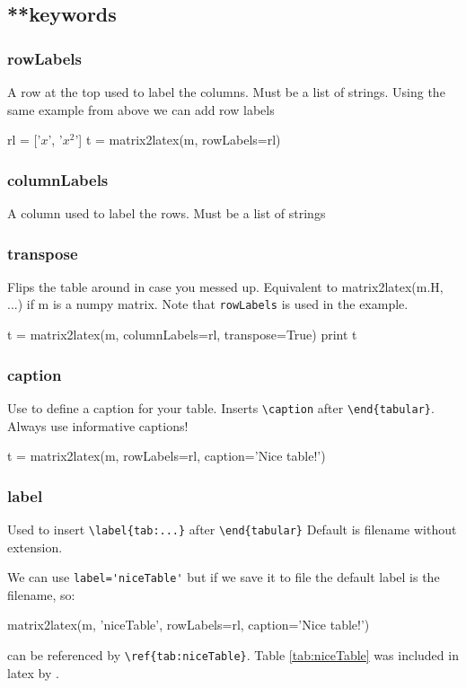 \subsection{**keywords}
\subsubsection{rowLabels}
    A row at the top used to label the columns.
    Must be a list of strings.
Using the same example from above we can add row labels
\begin{sageblock}
rl = ['$x$', '$x^2$']
t = matrix2latex(m, rowLabels=rl)
\end{sageblock}

\subsubsection{columnLabels}
    A column used to label the rows.
    Must be a list of strings
\subsubsection{transpose}
Flips the table around in case you messed up. Equivalent to
matrix2latex(m.H, ...)
if m is a numpy matrix.
Note that \lstinline{rowLabels} is used in the example.
\begin{sageblock}
t = matrix2latex(m, columnLabels=rl, transpose=True)
print t
\end{sageblock}

\subsubsection{caption}
    Use to define a caption for your table.
    Inserts \verb!\caption! after \verb!\end{tabular}!.
Always use informative captions!
\begin{sageblock}
t = matrix2latex(m, rowLabels=rl,
                 caption='Nice table!')
\end{sageblock}

\subsubsection{label}
Used to insert \verb!\label{tab:...}! after \verb!\end{tabular}!
Default is filename without extension.

We can use \lstinline{label='niceTable'} but if we save it to file
the default label is the filename, so:
\begin{sageblock}
matrix2latex(m, 'niceTable', rowLabels=rl, 
                 caption='Nice table!')
\end{sageblock}
can be referenced by \verb!\ref{tab:niceTable}!. Table \ref{tab:niceTable}
was included in latex by \verb!!.


